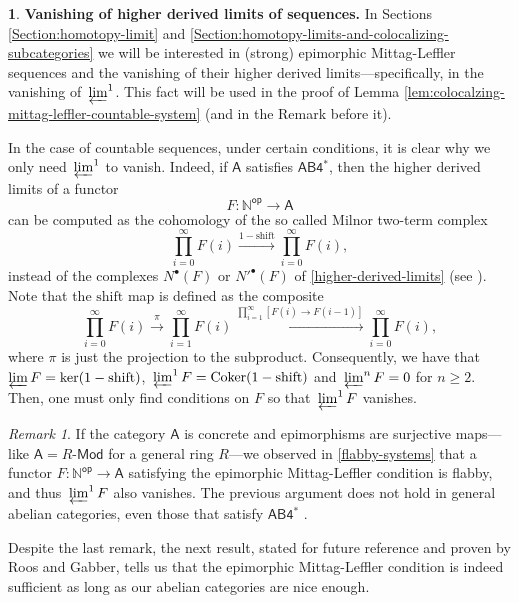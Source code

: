 \documentclass[reqno,11pt]{amsart}
\theoremstyle{plain}
\theoremstyle{remark}
\newtheorem*{rem}{Remark}
\theoremstyle{definition}
\newtheorem{cosa}[thm]{}
\numberwithin{equation}{thm}
\newcommand{\SA}{\mathsf{A}}
\newcommand{\NN}{\mathbb{N}}
\newcommand{\lto}{\longrightarrow}
\DeclareMathOperator{\cok}{Coker}
\newcommand{\md}{\text{-}\mathsf{Mod}}
\newcommand{\op}{\mathsf{op}}
\begin{document}
	\begin{cosa}\label{countable-higher-derived-limits-abelian-cat}
		\textbf{Vanishing of higher derived limits of sequences.}
		In Sections \ref{Section:homotopy-limit} and \ref{Section:homotopy-limits-and-colocalizing-subcategories} we will be interested in (strong) epimorphic Mittag-Leffler sequences and the vanishing of their higher derived limits---specifically, in the vanishing of $\sideset{}{^{1}}\varprojlim$. This fact will be used in the proof of Lemma \ref{lem:colocalzing-mittag-leffler-countable-system} (and in the Remark before it).
		
		In the case of countable sequences, under certain conditions, it is clear why we only need $\sideset{}{^{1}}\varprojlim$ to vanish. Indeed, if $\SA$ satisfies $\mathsf{AB4^*}$, then the higher derived limits of a functor 
		\[
			F \colon \NN^\op \lto \SA
		\]
		can be computed as the cohomology of the so called Milnor two-term complex
		\[\prod_{i=0}^{\infty} F(i) \xrightarrow{1 - \text{shift}} \prod_{i=0}^{\infty} F(i),\]
		instead of the complexes $N^\bullet(F)$ or $N'^\bullet(F)$ of \ref{higher-derived-limits} (see \cite[Remark A.3.6.]{Ntc}). Note that the $\text{shift}$ map is defined as the composite
		\[
			\prod_{i=0}^{\infty} F(i) \xrightarrow{\pi} \prod_{i=1}^{\infty} F(i) \xrightarrow{\prod_{i=1}^{\infty} [F(i) \to F(i-1)]} \prod_{i=0}^{\infty} F(i),
		\]
		where $\pi$ is just the projection to the subproduct.
		Consequently, we have that $\varprojlim F = \ker(1 - \text{shift})$, $\sideset{}{^{1}}\varprojlim F = \cok(1- \text{shift})$ and $\sideset{}{^{n}}\varprojlim F = 0$ for $n \geq 2$. Then, one must only find conditions on $F$ so that $\sideset{}{^{1}}\varprojlim F$ vanishes. 
		
		\begin{rem}
			If the category $\SA$ is concrete and epimorphisms are surjective maps---like $\SA = R\md$ for a general ring $R$---we observed in \ref{flabby-systems} that a functor $F \colon \NN^\op \to \SA$ satisfying the epimorphic Mittag-Leffler condition is flabby, and thus $\sideset{}{^{1}}\varprojlim F$ also vanishes. The previous argument does not hold in general abelian categories, even those that satisfy $\mathsf{AB4^*}$ \cite[Proposition 3.12.]{Neeman2002}.
		\end{rem}
		
		Despite the last remark, the next result, stated for future reference and proven by Roos and Gabber, tells us that the epimorphic Mittag-Leffler condition is indeed sufficient as long as our abelian categories are nice enough.
		

\end{cosa}
\end{document}
